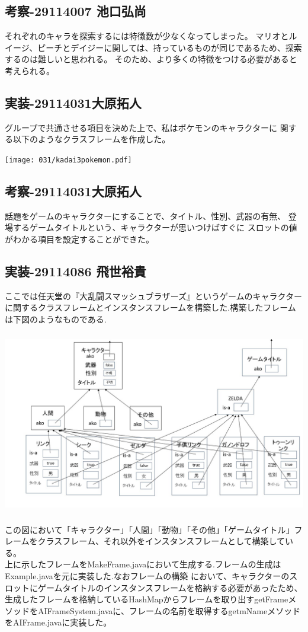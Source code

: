 \documentclass{jarticle}
\begin{document}
\subsection{考察-29114007 池口弘尚}
それぞれのキャラを探索するには特徴数が少なくなってしまった。
マリオとルイージ、ピーチとデイジーに関しては、持っているものが同じであるため、探索するのは難しいと思われる。
そのため、より多くの特徴をつける必要があると考えられる。

\subsection{実装-29114031大原拓人}
    グループで共通させる項目を決めた上で、私はポケモンのキャラクターに
    関する以下のようなクラスフレームを作成した。
    \begin{center}
        \texttt{[image: 031/kadai3pokemon.pdf]}
    \end{center}
\subsection{考察-29114031大原拓人}
    話題をゲームのキャラクターにすることで、タイトル、性別、武器の有無、
    登場するゲームタイトルという、キャラクターが思いつけばすぐに
    スロットの値がわかる項目を設定することができた。
\subsection{実装-29114086 飛世裕貴}
ここでは任天堂の『大乱闘スマッシュブラザーズ』というゲームのキャラクターに関するクラスフレームとインスタンスフレームを構築した.構築したフレームは下図のようなものである.


\includegraphics[width=150mm,height=80mm]{086/Slide1.jpg}

この図において「キャラクター」「人間」「動物」「その他」「ゲームタイトル」フレームをクラスフレーム、それ以外をインスタンスフレームとして構築している。\\
上に示したフレームをMakeFrame.javaにおいて生成する.フレームの生成はExample.javaを元に実装した.なおフレームの構築
において、キャラクターのスロットにゲームタイトルのインスタンスフレームを格納する必要があったため、生成したフレームを格納しているHashMapからフレームを取り出すgetFrameメソッドをAIFrameSystem.javaに、フレームの名前を取得するgetmNameメソッドをAIFrame.javaに実装した。
\end{document}
